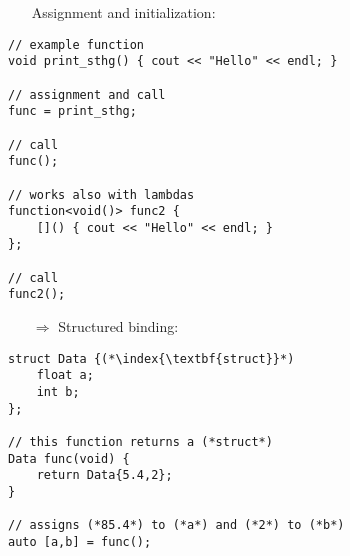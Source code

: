 \documentclass[10pt]{book}
\begin{document}
\begin{enumerate}
\item[] Assignment and initialization:
\end{enumerate}
\begin{lstlisting}
// example function
void print_sthg() { cout << "Hello" << endl; }

// assignment and call
func = print_sthg;

// call
func();

// works also with lambdas
function<void()> func2 { 
    []() { cout << "Hello" << endl; } 
};

// call
func2();
\end{lstlisting}
\begin{enumerate}
\item[$\Rightarrow$] Structured binding:
\end{enumerate}
\begin{lstlisting}
struct Data {(*\index{\textbf{struct}}*)
    float a;
    int b;
};

// this function returns a (*struct*)
Data func(void) {
    return Data{5.4,2};
}

// assigns (*85.4*) to (*a*) and (*2*) to (*b*)
auto [a,b] = func();
\end{lstlisting}
%
%
\end{document}
